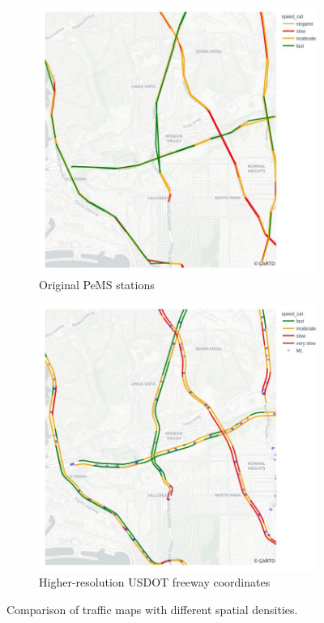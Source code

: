 \documentclass{article}
\begin{document}
\begin{figure}[hbt!]
    \centering
    \begin{subfigure}[b]{0.48\textwidth}
        \centering
        \includegraphics[width=\textwidth]{images/traffic_map_coarse.jpeg}
        \caption{Original PeMS stations}
        \label{fig:sensor-density-coarse}
    \end{subfigure}
    \hfill
    \begin{subfigure}[b]{0.48\textwidth}
        \centering
        \includegraphics[width=\textwidth]{images/traffic_map.jpeg}
        \caption{Higher-resolution USDOT freeway coordinates}
        \label{fig:sensor-density-fine}
    \end{subfigure}
    \caption{Comparison of traffic maps with different spatial densities.}
    \label{fig:sensor-density-comparison}
\end{figure}
\end{document}
